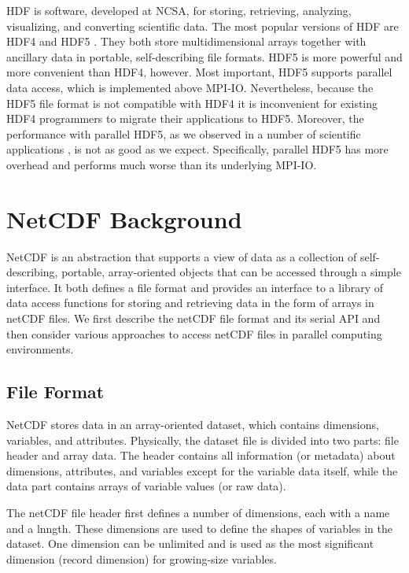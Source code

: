 \documentclass[10pt,twocolumn]{article}          %
\begin{document}
HDF is software, developed at NCSA, for storing, retrieving, analyzing, visualizing, and converting scientific
data. The most popular versions of HDF are HDF4 \cite{HDF4} and HDF5 \cite{HDF5}. They both store
multidimensional arrays together with ancillary data in portable, self-describing file formats.
HDF5 is more powerful and more convenient than HDF4, however. Most important, HDF5
supports parallel data access, which is implemented above MPI-IO. Nevertheless, because the HDF5 file
format is not compatible with HDF4 it is inconvenient for existing HDF4
programmers to migrate their applications to HDF5. Moreover, the performance with parallel HDF5, as
we observed in a number of scientific applications \cite{LLCT02, RNCZ01}, is not as good as we
expect. Specifically, parallel HDF5 has more overhead and performs much worse than its underlying
MPI-IO.

\section{NetCDF Background}

NetCDF is an abstraction that supports a view of data as a collection of self-describing, portable,
array-oriented objects that can be accessed through a simple interface. It both defines a file
format and provides an interface to a library of data access functions for storing and retrieving
data in the form of arrays in netCDF files. We first describe the netCDF file format and its
serial API and then consider various approaches to access netCDF files in
parallel computing environments.

\subsection{File Format}

NetCDF stores data in an array-oriented dataset, which contains dimensions, variables, and
attributes. Physically, the dataset file is divided into two parts: file header and array data. The
header contains all information (or metadata) about dimensions, attributes, and variables except
for the variable data itself, while the data part contains arrays of variable values (or raw data).

The netCDF file header first defines a number of dimensions, each with a name and a lnngth. These
dimensions are used to define the shapes of variables in the dataset. One dimension can be
unlimited and is used as the most significant dimension (record dimension) for growing-size
variables.
\end{document}
